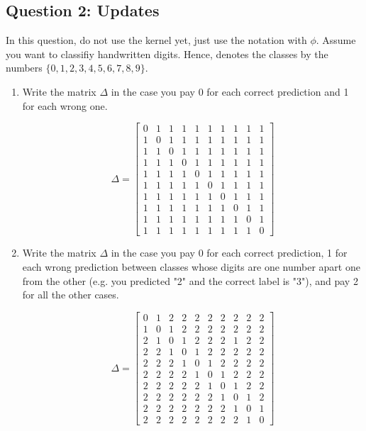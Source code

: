 \documentclass{article}
\begin{document}
\subsection{Question 2: Updates}
In this question, do not use the kernel yet, just use the notation with $\phi$. Assume you want to classifiy handwritten digits. Hence, denotes the classes by the numbers $\{0,1,2,3,4,5,6,7,8,9\}$. 
\begin{enumerate}[label=(\alph*)]
\item Write the matrix $\Delta$ in the case you pay 0 for each correct prediction and 1 for each wrong one.
\begin{mdframed}[backgroundcolor=lightgray]
\[
\Delta =
  \begin{bmatrix}
    0 & 1 & 1 & 1 & 1 & 1 & 1 & 1 & 1 & 1 \\
    1 & 0 & 1 & 1 & 1 & 1 & 1 & 1 & 1 & 1 \\
    1 & 1 & 0 & 1 & 1 & 1 & 1 & 1 & 1 & 1 \\
    1 & 1 & 1 & 0 & 1 & 1 & 1 & 1 & 1 & 1 \\
    1 & 1 & 1 & 1 & 0 & 1 & 1 & 1 & 1 & 1 \\
    1 & 1 & 1 & 1 & 1 & 0 & 1 & 1 & 1 & 1 \\
    1 & 1 & 1 & 1 & 1 & 1 & 0 & 1 & 1 & 1 \\
    1 & 1 & 1 & 1 & 1 & 1 & 1 & 0 & 1 & 1 \\
    1 & 1 & 1 & 1 & 1 & 1 & 1 & 1 & 0 & 1 \\
    1 & 1 & 1 & 1 & 1 & 1 & 1 & 1 & 1 & 0 
  \end{bmatrix}
\]
\end{mdframed}

\item Write the matrix $\Delta$ in the case you pay 0 for each correct prediction, 1 for each wrong prediction between classes whose digits are one number apart one from the other (e.g. you predicted "2" and the correct label is "3"), and pay 2 for all the other cases.  
\begin{mdframed}[backgroundcolor=lightgray]
\[
\Delta =
  \begin{bmatrix}
    0 & 1 & 2 & 2 & 2 & 2 & 2 & 2 & 2 & 2 \\
    1 & 0 & 1 & 2 & 2 & 2 & 2 & 2 & 2 & 2 \\
    2 & 1 & 0 & 1 & 2 & 2 & 2 & 1 & 2 & 2 \\
    2 & 2 & 1 & 0 & 1 & 2 & 2 & 2 & 2 & 2 \\
    2 & 2 & 2 & 1 & 0 & 1 & 2 & 2 & 2 & 2 \\
    2 & 2 & 2 & 2 & 1 & 0 & 1 & 2 & 2 & 2 \\
    2 & 2 & 2 & 2 & 2 & 1 & 0 & 1 & 2 & 2 \\
    2 & 2 & 2 & 2 & 2 & 2 & 1 & 0 & 1 & 2 \\
    2 & 2 & 2 & 2 & 2 & 2 & 2 & 1 & 0 & 1 \\
    2 & 2 & 2 & 2 & 2 & 2 & 2 & 2 & 1 & 0 
  \end{bmatrix}
\]
\end{mdframed}


\end{enumerate}
\end{document}
